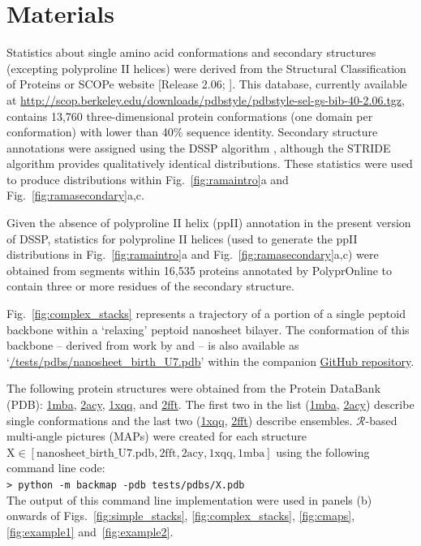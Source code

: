 \documentclass[fleqn,10pt,lineno]{wlpeerj} %
\newcommand{\Fig}[1]{Fig.~\ref{#1}}
\newcommand{\Figs}[1]{Figs.~\ref{#1}}
\newcommand{\n}[1]{{\color{red}#1}}
\newcommand{\code}[1]{\texttt{#1}\xspace}
\newcommand{\rr}{$\mathcal{R}$\xspace}
\begin{document}
\section*{Materials}

Statistics about single amino acid conformations and secondary structures (excepting polyproline II helices) were derived from the Structural Classification of Proteins or SCOPe website [Release 2.06; \cite{Fox2014}]. This database, currently available at  \url{http://scop.berkeley.edu/downloads/pdbstyle/pdbstyle-sel-gs-bib-40-2.06.tgz}, contains 13,760 three-dimensional protein conformations (one domain per conformation) with lower than 40\% sequence identity. Secondary structure annotations were assigned using the DSSP algorithm \citep{Kabsch1983}, although the STRIDE algorithm \citep{Frishman1995} provides qualitatively identical distributions. \n{These statistics were used to produce distributions within \Fig{fig:ramaintro}a and \Fig{fig:ramasecondary}a,c.}

Given the absence of polyproline II helix (ppII) annotation in the 
present version of DSSP, statistics for polyproline II helices 
\n{(used to generate the ppII distributions in \Fig{fig:ramaintro}a and \Fig{fig:ramasecondary}a,c)} were obtained from segments 
within 16,535 proteins annotated by PolyprOnline \citep{Chebrek2014} to contain three or more residues of the secondary structure.

\n{\Fig{fig:complex_stacks}} represents a trajectory of a portion of a single peptoid backbone 
within a `relaxing' peptoid nanosheet bilayer. The conformation of this 
backbone -- derived from work by \cite{Mannige2015} and 
\cite{Mannige2016} -- is also available as `\href{https://github.com/ranjanmannige/backmap/blob/master/tests/pdbs/nanosheet_birth_U7.pdb}{/tests/pdbs/nanosheet\_birth\_U7.pdb}' within the companion \href{https://github.com/ranjanmannige/backmap/}{GitHub repository}.

The following protein structures were obtained from the Protein DataBank (PDB): \href{https://www.rcsb.org/structure/1MBA}{1mba}, \href{https://www.rcsb.org/structure/2ACY}{2acy}, \href{https://www.rcsb.org/structure/1XQQ}{1xqq}, and \href{https://www.rcsb.org/structure/2FFT}{2fft}. The first two in the list (\href{https://www.rcsb.org/structure/1MBA}{1mba}, \href{https://www.rcsb.org/structure/2ACY}{2acy}) describe single conformations and the last two (\href{https://www.rcsb.org/structure/1XQQ}{1xqq}, \href{https://www.rcsb.org/structure/2FFT}{2fft}) describe ensembles. \n{\rr-based multi-angle pictures (MAPs) were created for each structure $\textrm{X} \in [\textrm{nanosheet\_birth\_U7.pdb},\textrm{2fft},\textrm{2acy},\textrm{1xqq},\textrm{1mba}]$ using the following command line code:\\
\code{> python -m backmap -pdb tests/pdbs/X.pdb}\\
The output of this command line implementation were used in panels (b) onwards of \Figs{fig:simple_stacks}, \ref{fig:complex_stacks}, \ref{fig:cmaps}, \ref{fig:example1} and~\ref{fig:example2}.}
\end{document}
